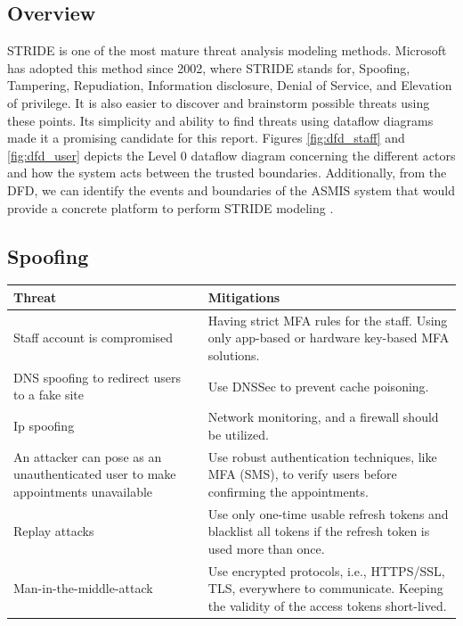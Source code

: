 \subsection{Overview}
STRIDE is one of the most mature threat analysis modeling methods. Microsoft has adopted this method since 2002, where STRIDE stands for, Spoofing, Tampering, Repudiation, Information disclosure, Denial of Service, and Elevation of privilege. It is also easier to discover and brainstorm possible threats using these points. Its simplicity and ability to find threats using dataflow diagrams made it a promising candidate for this report.\newline\newline
Figures \ref{fig:dfd_staff} and \ref{fig:dfd_user} depicts the Level 0 dataflow diagram concerning the different actors and how the system acts between the trusted boundaries. Additionally, from the DFD, we can identify the events and boundaries of the ASMIS system that would provide a concrete platform to perform STRIDE modeling \citep[p.~1]{shevchenko2018threat}.

\subsection{Spoofing}
\begingroup
\centering
\setlength{\tabcolsep}{6.5pt} %
\renewcommand{\arraystretch}{1.8} %
\begin{longtable}{ |p{7cm}| p{8cm} |}
\hline
\textbf{Threat} & \textbf{Mitigations}\\
\hline
Staff account is compromised & Having strict MFA rules for the staff. Using only app-based or hardware key-based MFA solutions. \\
\hline
DNS spoofing to redirect users to a fake site & Use DNSSec to prevent cache poisoning. \\
\hline
Ip spoofing & Network monitoring, and a firewall should be utilized.\\
\hline
An attacker can pose as an unauthenticated user to make appointments unavailable & Use robust authentication techniques, like MFA (SMS), to verify users before confirming the appointments.\\
\hline
Replay attacks & Use only one-time usable refresh tokens and blacklist all tokens if the refresh token is used more than once.\\
\hline
Man-in-the-middle-attack & Use encrypted protocols, i.e., HTTPS/SSL, TLS, everywhere to communicate.\newline
Keeping the validity of the access tokens short-lived. \\
\hline
\end{longtable}
\endgroup

